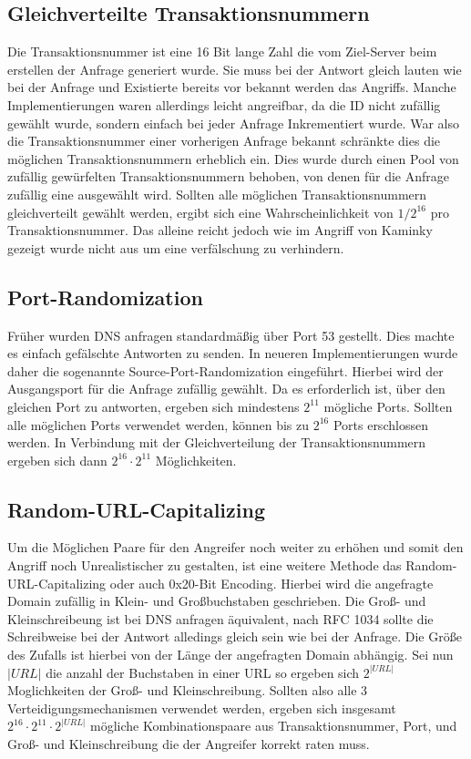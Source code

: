 \documentclass[10pt,a4paper]{article}
\begin{document}
\subsection*{Gleichverteilte Transaktionsnummern}
Die Transaktionsnummer ist eine 16 Bit lange Zahl die vom Ziel-Server beim erstellen der Anfrage generiert wurde. Sie muss bei der Antwort gleich lauten wie bei der Anfrage und Existierte bereits vor bekannt werden das Angriffs. Manche Implementierungen waren allerdings leicht angreifbar, da die ID nicht zufällig gewählt wurde, sondern einfach bei jeder Anfrage Inkrementiert wurde. War also die Transaktionsnummer einer vorherigen Anfrage bekannt schränkte dies die möglichen Transaktionsnummern erheblich ein. Dies wurde durch einen Pool von zufällig gewürfelten Transaktionsnummern behoben, von denen für die Anfrage zufällig eine ausgewählt wird. Sollten alle möglichen Transaktionsnummern gleichverteilt gewählt werden, ergibt sich eine Wahrscheinlichkeit von $1/2^{16}$ pro Transaktionsnummer. Das alleine reicht jedoch wie im Angriff von Kaminky gezeigt wurde nicht aus um eine verfälschung zu verhindern. 

\subsection*{Port-Randomization}
Früher wurden DNS anfragen standardmäßig über Port 53 gestellt. Dies machte es einfach gefälschte Antworten zu senden. In neueren Implementierungen wurde daher die sogenannte Source-Port-Randomization eingeführt. Hierbei wird der Ausgangsport für die Anfrage zufällig gewählt. Da es erforderlich ist, über den gleichen Port zu antworten, ergeben sich mindestens $2^{11}$ mögliche Ports. Sollten alle möglichen Ports verwendet werden, können bis zu $2^{16}$ Ports erschlossen werden. In Verbindung mit der Gleichverteilung der Transaktionsnummern ergeben sich dann $2^{16} \cdot 2^{11}$ Möglichkeiten.

\subsection*{Random-URL-Capitalizing}
Um die Möglichen Paare für den Angreifer noch weiter zu erhöhen und somit den Angriff noch Unrealistischer zu gestalten, ist eine weitere Methode das Random-URL-Capitalizing oder auch 0x20-Bit Encoding. Hierbei wird die angefragte Domain zufällig in Klein- und Großbuchstaben geschrieben. Die Groß- und Kleinschreibeung ist bei DNS anfragen äquivalent, nach RFC 1034 sollte die Schreibweise bei der Antwort alledings gleich sein wie bei der Anfrage. Die Größe des Zufalls ist hierbei von der Länge der angefragten Domain abhängig. Sei nun $|\mathit{URL}|$ die anzahl der Buchstaben in einer URL so ergeben sich $2^{|URL|}$ Moglichkeiten der Groß- und Kleinschreibung. Sollten also alle 3 Verteidigungsmechanismen verwendet werden, ergeben sich insgesamt $2^{16} \cdot 2^{11} \cdot 2^{|URL|}$ mögliche Kombinationspaare aus Transaktionsnummer, Port, und Groß- und Kleinschreibung die der Angreifer korrekt raten muss.
\end{document}
